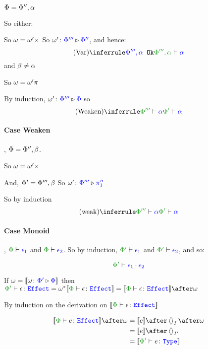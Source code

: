 \documentclass{report}
\begin{document}
    $\Phi = \Phi'', \alpha$

    So either:

        So $\omega = \omega'\times$
        So $\omega' \colon {\color{blue}\Phi'''} \triangleright {\color {blue} \Phi''}$, and hence:
        \begin{equation}
            \ntreeruleI{Var}{\ok{\P''', \a}}{\wellformed{\P''',\a}{\a}}
        \end{equation}
     and $\beta \neq\alpha$

    So $\omega = \omega'\pi$

    By induction, $\omega' \colon {\color{blue}\Phi'''} \triangleright {\color {blue} \Phi}$
    so \begin{equation}
        \ntreeruleI{Weaken}{\wellformed{\P'''}{\a}}{\wellformed{\P'}{\a}}
    \end{equation}

    \paragraph{Case Weaken}

    \bi, $\Phi = \Phi'', \beta$.

    So $\omega = \omega'\times$

    And, $\Phi' = \Phi''', \beta$
    So \bi $\omega' \colon {\color{blue}\Phi'''} \triangleright {\color {blue} \pi_1''}$

    So by induction
    \begin{equation}
        \ntreeruleI{weak}{\wellformed{\P'''}{\a}}{\wellformed{\P'}{\a}}
    \end{equation}


    \paragraph{Case Monoid}

    \bi, $\wellformed{\P}{\e_1}$ and $\wellformed{\P}{\e_2}$. So by induction,
    $\wellformed{\P'}{\e_1}$ and $\wellformed{\P'}{\e_2}$, and so:

    \begin{equation}
        \wellformed{\P'}{\e_1\dot\e_2}
    \end{equation}

If $\omega = {\bf [\![}\omega \colon {\color{blue}\Phi'} \triangleright {\color {blue} \Phi}{\bf ]\!]}$ then $\typerelation{\P'}{\e}{\effect} = \w\star\deno{\typerelation{\P}{\e}{\effect}} = \deno{\typerelation{\P}{\e}{\effect}}\after\w$

\proof
By induction on the derivation on $\deno{\typerelation{\P}{\e}{\effect}}$

\begin{align*}
    \deno{\typerelation{\P}{e}{\effect}}\after\w & = \deno{e}\after\term{I}\after\w \\
    & = \deno{e}\after\term{I'} \\
    & = \deno{\typerelation{\P'}{e}{\type}}\\
\end{align*}
\end{document}
